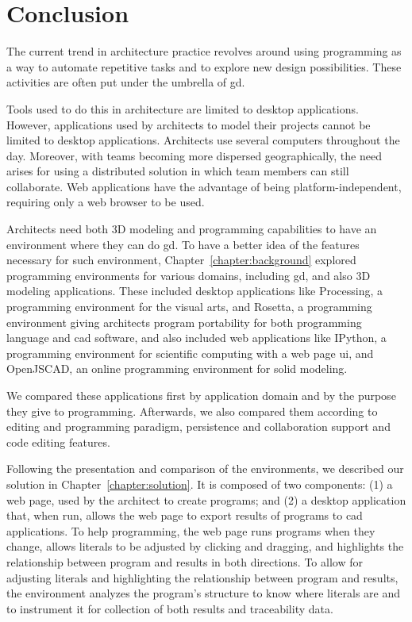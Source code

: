 
\chapter{Conclusion}
\label{chapter:conclusion}
The current trend in architecture practice revolves around using programming as a way to automate repetitive tasks and to explore new design possibilities.
These activities are often put under the umbrella of \acrfull{gd}.

Tools used to do this in architecture are limited to desktop applications.
However, applications used by architects to model their projects cannot be limited to desktop applications.
Architects use several computers throughout the day.
Moreover, with teams becoming more dispersed geographically, the need arises for using a distributed solution in which team members can still collaborate.
Web applications have the advantage of being platform-independent, requiring only a web browser to be used.

Architects need both 3D modeling and programming capabilities to have an environment where they can do \gls{gd}.
To have a better idea of the features necessary for such environment, Chapter~\ref{chapter:background} explored programming environments for various domains, including \gls{gd}, and also 3D modeling applications.
These included desktop applications like Processing, a programming environment for the visual arts, and Rosetta, a programming environment giving architects program portability for both programming language and \gls{cad} software, and also included web applications like IPython, a programming environment for scientific computing with a web page \gls{ui}, and OpenJSCAD, an online programming environment for solid modeling.

We compared these applications first by application domain and by the purpose they give to programming.
Afterwards, we also compared them according to editing and programming paradigm, persistence and collaboration support and code editing features.

Following the presentation and comparison of the environments, we described our solution in Chapter~\ref{chapter:solution}.
It is composed of two components:
(1) a web page, used by the architect to create programs;
and (2) a desktop application that, when run, allows the web page to export results of programs to \gls{cad} applications.
To help programming, the web page runs programs when they change, allows literals to be adjusted by clicking and dragging, and highlights the relationship between program and results in both directions.
To allow for adjusting literals and highlighting the relationship between program and results, the environment analyzes the program's structure to know where literals are and to instrument it for collection of both results and traceability data.

